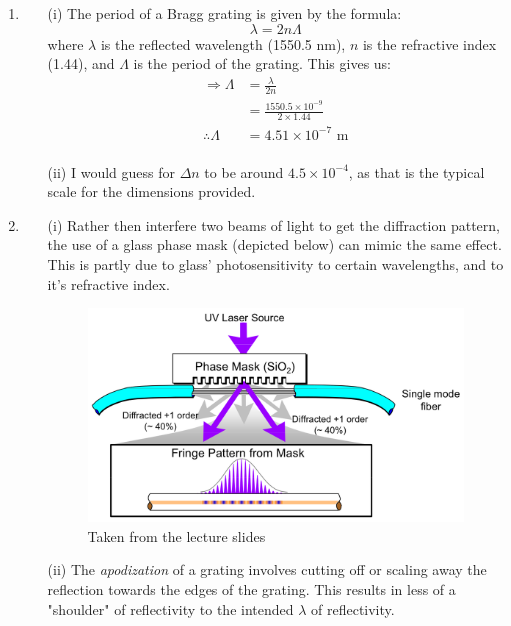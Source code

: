 \documentclass[10pt,a4paper]{article}
\begin{document}
\begin{enumerate}
	\item 
		\begin{itemize}
			\item[(i)] The period of a Bragg grating is given by the formula:
				\begin{equation*}
					\lambda = 2 n \Lambda
				\end{equation*}
				where $\lambda$ is the reflected wavelength (1550.5 nm), $n$ is the refractive index (1.44), and $\Lambda$ is the period of the grating. This gives us:
				\begin{align*}
					\Rightarrow \Lambda &= \frac{\lambda}{2n} \\
					 &= \frac{1550.5 \times 10^{-9}}{2 \times 1.44} \\
					\therefore \Lambda &= 4.51 \times 10^{-7} \mbox{ m} \\
				\end{align*}
			\item[(ii)] I would guess for $\Delta n$ to be around $4.5 \times 10 ^{-4}$, as that is the typical scale for the dimensions provided.
		\end{itemize}
	\item
		\begin{itemize}
			\item[(i)] Rather then interfere two beams of light to get the diffraction pattern, the use of a glass phase mask (depicted below) can mimic the same effect. This is partly due to glass' photosensitivity to certain wavelengths, and to it's refractive index.
				\begin{figure}[!h]
					\begin{center}
						\includegraphics[width=0.7\linewidth]{phaseMask.png}
					\end{center}
					\caption{Taken from the lecture slides}
				\end{figure}
			\item[(ii)] The \textit{apodization} of a grating involves cutting off or scaling away the reflection towards the edges of the grating. This results in less of a "shoulder" of reflectivity to the intended $\lambda$ of reflectivity.


\end{itemize}
\end{enumerate}
\end{document}
